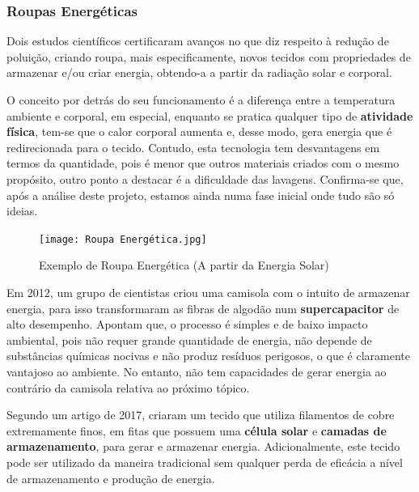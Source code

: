 \documentclass[letterpaper,12pt]{article}
\begin{document}
\subsubsection{Roupas Energéticas}
\par \citep{rosa_2012_cientistas, sousa_2019_camiseta,ciclovivo_2017_cientista}
Dois estudos científicos certificaram avanços no que diz respeito à redução de poluição, criando roupa, mais especificamente, novos tecidos com propriedades de armazenar e/ou criar energia, obtendo-a a partir da radiação solar e corporal.
\par O conceito por detrás do seu funcionamento é a diferença entre a temperatura ambiente e corporal, em especial, enquanto se pratica qualquer tipo de {\bf atividade física}, tem-se que o calor corporal aumenta e, desse modo, gera energia que é redirecionada para o tecido. Contudo, esta tecnologia tem desvantagens em termos da quantidade, pois é menor que outros materiais criados com o mesmo propósito, outro ponto a destacar é a dificuldade das lavagens. Confirma-se que, após a análise deste projeto, estamos ainda numa fase inicial onde tudo são só ideias.
\begin{figure}[h!]
    \centering
    \texttt{[image: Roupa Energética.jpg]}
    \caption{Exemplo de Roupa Energética (A partir da Energia Solar)}
    \label{fig:Roupa Energética}
\end{figure}
\par Em 2012, um grupo de cientistas criou uma camisola com o intuito de armazenar energia, para isso transformaram as fibras de algodão num {\bf supercapacitor} de alto desempenho. Apontam que, o processo é simples e de baixo impacto ambiental, pois não requer grande quantidade de energia, não depende de substâncias químicas nocivas e não produz resíduos perigosos, o que é claramente vantajoso ao ambiente. No entanto, não tem capacidades de gerar energia ao contrário da camisola relativa ao próximo tópico.
\par Segundo um artigo de 2017, criaram um tecido que utiliza filamentos de cobre extremamente finos, em fitas que possuem uma {\bf célula solar} e {\bf camadas de armazenamento}, para gerar e armazenar energia. Adicionalmente, este tecido pode ser utilizado da maneira tradicional sem qualquer perda de eficácia a nível de armazenamento e produção de energia.
\newpage
\end{document}
